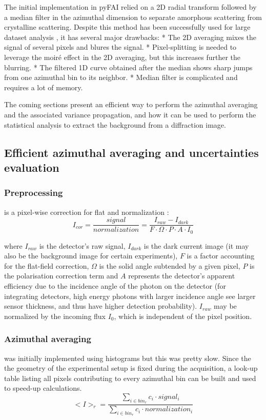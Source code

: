 \documentclass[preprint]{iucr}              %
\begin{document}
The initial implementation in pyFAI \cite{pdj2013} relied on a 2D radial transform followed by a median filter in the azimuthal dimension 
to separate amorphous scattering from crystalline scattering.
Despite this method has been successfully used for large dataset analysis \cite{brocades}, it has several major drawbacks:
* The 2D averaging mixes the signal of several pixels and blures the signal. 
* Pixel-splitting is needed to leverage the moiré effect in the 2D averaging, but this increases further the blurring. 
* The filtered 1D curve obtained after the median shows sharp jumps from one azimuthal bin to its neighbor.
* Median filter is complicated and requires a lot of memory.
    
The coming sections present an efficient way to perform the azimuthal averaging and the associated variance propagation, 
and how it can be used to perform the statistical analysis to extract the background from a diffraction image. 

\subsection{Efficient azimuthal averaging and uncertainties evaluation}

\subsubsection{Preprocessing} is a pixel-wise correction for flat and normalization \cite{pyfai_2020}: 
\begin{equation}
I_{cor} = \frac{signal}{normalization}  = \frac{I_{raw} - I_{dark}}{F \cdot
\Omega \cdot P \cdot A \cdot I_0} 
\end{equation}

where $I_{raw}$ is the detector's raw signal, $I_{dark}$ is the dark current
image (it may also be the background image for certain experiments), $F$ is a 
factor accounting for the flat-field correction, $\Omega$ is the solid
angle subtended by a given pixel, $P$ is the polarisation correction term and
$A$ represents the detector's apparent efficiency due to the incidence angle of the
photon on the detector (for integrating detectors, high energy photons with
larger incidence angle see larger sensor thickness, and thus have higher
detection probability).
$I_{raw}$ may be normalized by the incoming flux $I_0$, which is
independent of the pixel position.

\subsubsection{Azimuthal averaging} was initially implemented using histograms but this was pretty slow.
Since the the geometry of the experimental setup is fixed during the acquisition, 
a look-up table listing all pixels contributing to every azimuthal bin can be built and used to speed-up calculations.
\begin{equation}
<I>_{r} = \frac{\sum\limits_{i \in bin_r} c_i \cdot signal_i}
                        {\sum\limits_{i \in bin_r} c_i \cdot normalization_i} 
\end{equation}
\end{document}
